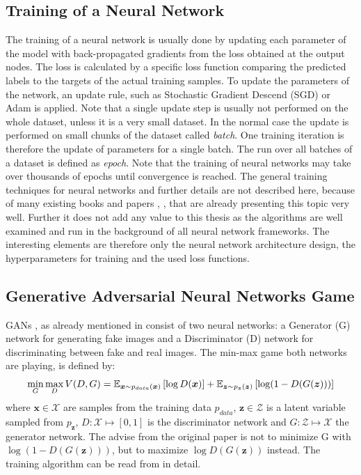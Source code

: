 
\subsection{Training of a Neural Network}
The training of a neural network is usually done by updating each parameter of the model with back-propagated gradients from the loss obtained at the output nodes.
The loss is calculated by a specific loss function comparing the predicted labels to the targets of the actual training samples.
To update the parameters of the network, an update rule, such as Stochastic Gradient Descend (SGD) or Adam \cite{Kingma2015} is applied.
Note that a single update step is usually not performed on the whole dataset, unless it is a very small dataset. 
In the normal case the update is performed on small chunks of the dataset called \emph{batch}.
One training iteration is therefore the update of parameters for a single batch.
The run over all batches of a dataset is defined as \emph{epoch}.
Note that the training of neural networks may take over thousands of epochs until convergence is reached.
The general training techniques for neural networks and further details are not described here, because of many existing books and papers \cite{LeCun2006}, \cite{Goodfellow2016}, \cite{DeepLearning} that are already presenting this topic very well. 
Further it does not add any value to this thesis as the algorithms are well examined and run in the background of all neural network frameworks.
The interesting elements are therefore only the neural network architecture design, the hyperparameters for training and the used loss functions.



\subsection{Generative Adversarial Neural Networks Game}\label{sec:nn_theory_gan}
\thesisStateRevised
GANs \cite{Goodfellow2014}, as already mentioned in  consist of two neural networks: a Generator (G) network for generating fake images and a Discriminator (D) network for discriminating between fake and real images.
The min-max game both networks are playing, is defined by:
\begin{equation}\label{eq:nn_theory_gan}
  \underset{G}{\min} \, \underset{D}{\max} \, V(D, G) = \mathbb{E}_{\bm{x} \sim p_{data}(\bm{x})}\left[ \log D(\bm{x}) \right] + 
    \mathbb{E}_{\bm{z} \sim p_{\bm{z}}(\bm{z})}\left[ \log (1 - D(G(\bm{z}))) \right]
\end{equation}
where $\bm{x} \in \mathcal{X}$ are samples from the training data $p_{data}$, $\bm{z} \in \mathcal{Z}$ is a latent variable sampled from $p_{\bm{z}}$, $D: \mathcal{X} \mapsto [0, 1]$ is the discriminator network and $G: \mathcal{Z} \mapsto \mathcal{X}$ the generator network.
The advise from the original paper is not to minimize G with $\log (1 - D(G(\bm{z})))$, but to maximize $\log D(G(\bm{z}))$ instead.
The training algorithm can be read from \cite{Goodfellow2014} in detail.